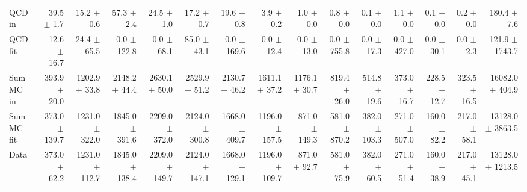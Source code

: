 \begin{table}[htbp]
{\begin{tabular}{lrrrrrrrrrrrrrr}
\hline
QCD in & 39.5 $\pm$ 1.7 & 15.2 $\pm$ 0.6 & 57.3 $\pm$ 2.4 & 24.5 $\pm$ 1.0 & 17.2 $\pm$ 0.7 & 19.6 $\pm$ 0.8 & 3.9 $\pm$ 0.2 & 1.0 $\pm$ 0.0 & 0.8 $\pm$ 0.0 & 0.1 $\pm$ 0.0 & 1.1 $\pm$ 0.0 & 0.1 $\pm$ 0.0 & 0.2 $\pm$ 0.0 & 180.4 $\pm$ 7.6 \\
QCD fit & 12.6 $\pm$ 16.7 & 24.4 $\pm$ 65.5 & 0.0 $\pm$ 122.8 & 0.0 $\pm$ 68.1 & 85.0 $\pm$ 43.1 & 0.0 $\pm$ 169.6 & 0.0 $\pm$ 12.4 & 0.0 $\pm$ 13.0 & 0.0 $\pm$ 755.8 & 0.0 $\pm$ 17.3 & 0.0 $\pm$ 427.0 & 0.0 $\pm$ 30.1 & 0.0 $\pm$ 2.3 & 121.9 $\pm$ 1743.7 \\
\hline
Sum MC in & 393.9 $\pm$ 20.0 & 1202.9 $\pm$ 33.8 & 2148.2 $\pm$ 44.4 & 2630.1 $\pm$ 50.0 & 2529.9 $\pm$ 51.2 & 2130.7 $\pm$ 46.2 & 1611.1 $\pm$ 37.2 & 1176.1 $\pm$ 30.7 & 819.4 $\pm$ 26.0 & 514.8 $\pm$ 19.6 & 373.0 $\pm$ 16.7 & 228.5 $\pm$ 12.7 & 323.5 $\pm$ 16.5& 16082.0 $\pm$ 404.9 \\
Sum MC fit & 373.0 $\pm$ 139.7 & 1231.0 $\pm$ 322.0 & 1845.0 $\pm$ 391.6 & 2209.0 $\pm$ 372.0 & 2124.0 $\pm$ 300.8 & 1668.0 $\pm$ 409.7 & 1196.0 $\pm$ 157.5 & 871.0 $\pm$ 149.3 & 581.0 $\pm$ 870.2 & 382.0 $\pm$ 103.3 & 271.0 $\pm$ 507.0 & 160.0 $\pm$ 82.2 & 217.0 $\pm$ 58.1 & 13128.0 $\pm$ 3863.5 \\
\hline
Data & 373.0 $\pm$ 62.2 & 1231.0 $\pm$ 112.7 & 1845.0 $\pm$ 138.4 & 2209.0 $\pm$ 149.7 & 2124.0 $\pm$ 147.1 & 1668.0 $\pm$ 129.1 & 1196.0 $\pm$ 109.7 & 871.0 $\pm$ 92.7 & 581.0 $\pm$ 75.9 & 382.0 $\pm$ 60.5 & 271.0 $\pm$ 51.4 & 160.0 $\pm$ 38.9 & 217.0 $\pm$ 45.1 & 13128.0 $\pm$ 1213.5 \\
\hline
\end{tabular}
}
\end{table}
